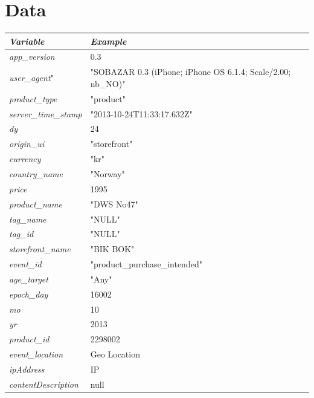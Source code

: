 
\appendix
\clearpage

\chapter{Data}\label{app:req}
    \begin{table}[H]
        \centering
        \begin{tabular}{l|l}
            \toprule
            \emph{Variable}        & \emph{Example}   \\
            \midrule
            \emph{app\_version}   &   0.3  \\
            \emph{user\_agent}"   &   "SOBAZAR 0.3 (iPhone; iPhone OS 6.1.4; Scale/2.00; nb\_NO)"   \\
            \emph{product\_type}  &   "product"    \\
            \emph{server\_time\_stamp} &   "2013-10-24T11:33:17.632Z"   \\
            \emph{dy}    &   24   \\
            \emph{origin\_ui} &   "storefront"     \\
            \emph{currency}  &   "kr"     \\
            \emph{country\_name}  &   "Norway"     \\
            \emph{price} &   1995     \\
            \emph{product\_name}  &   "DWS No47"   \\
            \emph{tag\_name}  &   "NULL"   \\
            \emph{tag\_id}    &   "NULL"   \\
            \emph{storefront\_name}   &   "BIK BOK"    \\
            \emph{event\_id}  &   "product\_purchase\_intended"  \\
            \emph{age\_target}    &   "Any"    \\
            \emph{epoch\_day} &   16002    \\
            \emph{mo}    &   10   \\
            \emph{yr}    &   2013     \\
            \emph{product\_id}    &   2298002  \\
            \emph{event\_location}    &   Geo Location     \\
            \emph{ipAddress} &   IP  \\
            \emph{contentDescription}    &   null     \\

\end{tabular}
\end{table}
